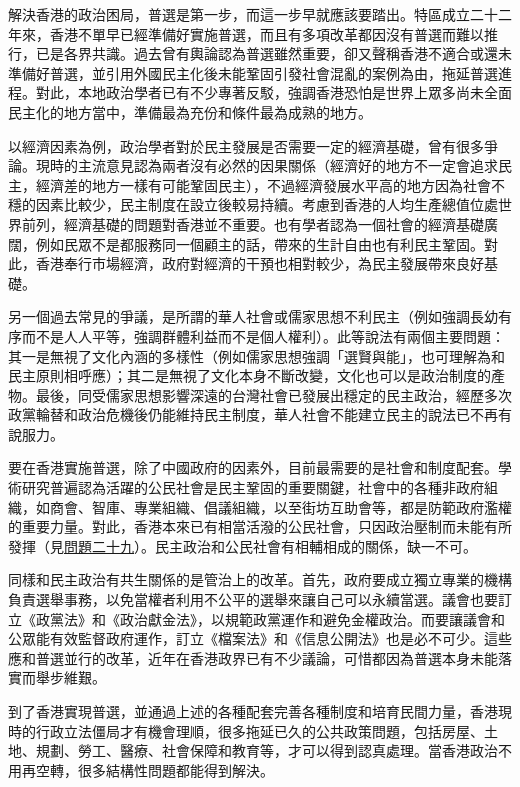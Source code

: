 解決香港的政治困局，普選是第一步，而這一步早就應該要踏出。特區成立二十二年來，香港不單早已經準備好實施普選，而且有多項改革都因沒有普選而難以推行，已是各界共識。過去曾有輿論認為普選雖然重要，卻又聲稱香港不適合或還未準備好普選，並引用外國民主化後未能鞏固引發社會混亂的案例為由，拖延普選進程。對此，本地政治學者已有不少專著反駁，強調香港恐怕是世界上眾多尚未全面民主化的地方當中，準備最為充份和條件最為成熟的地方。

以經濟因素為例，政治學者對於民主發展是否需要一定的經濟基礎，曾有很多爭論。現時的主流意見認為兩者沒有必然的因果關係（經濟好的地方不一定會追求民主，經濟差的地方一樣有可能鞏固民主），不過經濟發展水平高的地方因為社會不穩的因素比較少，民主制度在設立後較易持續。考慮到香港的人均生產總值位處世界前列，經濟基礎的問題對香港並不重要。也有學者認為一個社會的經濟基礎廣闊，例如民眾不是都服務同一個顧主的話，帶來的生計自由也有利民主鞏固。對此，香港奉行市場經濟，政府對經濟的干預也相對較少，為民主發展帶來良好基礎。

另一個過去常見的爭議，是所謂的華人社會或儒家思想不利民主（例如強調長幼有序而不是人人平等，強調群體利益而不是個人權利）。此等說法有兩個主要問題：其一是無視了文化內涵的多樣性（例如儒家思想強調「選賢與能」，也可理解為和民主原則相呼應）；其二是無視了文化本身不斷改變，文化也可以是政治制度的產物。最後，同受儒家思想影響深遠的台灣社會已發展出穩定的民主政治，經歷多次政黨輪替和政治危機後仍能維持民主制度，華人社會不能建立民主的說法已不再有說服力。

要在香港實施普選，除了中國政府的因素外，目前最需要的是社會和制度配套。學術研究普遍認為活躍的公民社會是民主鞏固的重要關鍵，社會中的各種非政府組織，如商會、智庫、專業組織、倡議組織，以至街坊互助會等，都是防範政府濫權的重要力量。對此，香港本來已有相當活潑的公民社會，只因政治壓制而未能有所發揮（見\hyperref[sec:sec29]{問題二十九}）。民主政治和公民社會有相輔相成的關係，缺一不可。

同樣和民主政治有共生關係的是管治上的改革。首先，政府要成立獨立專業的機構負責選舉事務，以免當權者利用不公平的選舉來讓自己可以永續當選。議會也要訂立《政黨法》和《政治獻金法》，以規範政黨運作和避免金權政治。而要讓議會和公眾能有效監督政府運作，訂立《檔案法》和《信息公開法》也是必不可少。這些應和普選並行的改革，近年在香港政界已有不少議論，可惜都因為普選本身未能落實而舉步維艱。

到了香港實現普選，並通過上述的各種配套完善各種制度和培育民間力量，香港現時的行政立法僵局才有機會理順，很多拖延已久的公共政策問題，包括房屋、土地、規劃、勞工、醫療、社會保障和教育等，才可以得到認真處理。當香港政治不用再空轉，很多結構性問題都能得到解決。

